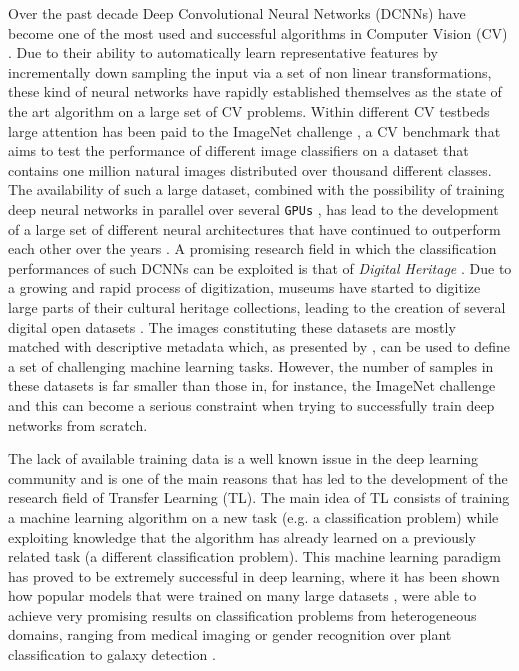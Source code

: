 Over the past decade Deep Convolutional Neural Networks (DCNNs) have become one of the most used and successful algorithms in Computer Vision (CV) \cite{donahue2014decaf, ma2015multimodal,tome2016deep}. Due to their ability to automatically learn representative features by incrementally down sampling the input via a set of non linear transformations, these kind of neural networks have rapidly established themselves as the state of the art algorithm on a large set of CV problems. Within different CV testbeds large attention has been paid to the ImageNet challenge \cite{deng2009imagenet}, a CV benchmark that aims to test the performance of different image classifiers on a dataset that contains one million natural images distributed over thousand different classes. The availability of such a large dataset, combined with the possibility of training deep neural networks in parallel over several \texttt{GPUs} \cite{krizhevsky2012imagenet}, has lead to the development of a large set of different neural architectures that have continued to outperform each other over the years \cite{simonyan2014very,szegedy2016rethinking,chollet2016xception,he2016deep,huang2017densely}.     
A promising research field in which the classification performances of such DCNNs can be exploited is that of \textit{Digital Heritage} \cite{parry2005digital}. Due to a growing and rapid process of digitization, museums have started to digitize large parts of their cultural heritage collections, leading to the creation of several digital open datasets \cite{allen2000collaboration, mensink2014rijksmuseum}. The images constituting these datasets are mostly matched with descriptive metadata  which, as presented by \citet{mensink2014rijksmuseum}, can be used to define a set of challenging machine learning tasks. However, the number of samples in these datasets is far smaller than those in, for instance, the ImageNet challenge and this can become a serious constraint when trying to successfully train deep networks from scratch.

The lack of available training data is a well known issue in the deep learning community and is one of the main reasons that has led to the development of the research field of Transfer Learning (TL). The main idea of TL consists of training a machine learning algorithm on a new task (e.g. a classification problem) while exploiting knowledge that the algorithm has already learned on a previously related task (a different classification problem). This machine learning paradigm has proved to be extremely successful in deep learning, where it has been shown how popular models that were trained on many large datasets \cite{huang2007labeled, stallkamp2011german}, were able to achieve very promising results on classification problems from heterogeneous domains, ranging from medical imaging \cite{tajbakhsh2016convolutional} or gender recognition \cite{van2015deep} over plant classification \cite{reyes2015fine} to galaxy detection \cite{ackermann2018using}.      

